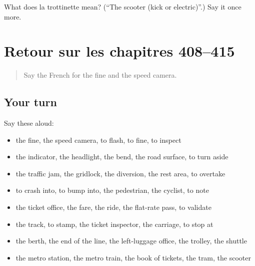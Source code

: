 \begin{tcolorbox}[breakable,colback=teal!4,colframe=teal!35!black,title={Before you move on}]
What does la trottinette mean? (\textquotedblleft{}The scooter (kick or electric)\textquotedblright{}.) Say it once more.
\end{tcolorbox}
\section[(dialogue)]{Retour sur les chapitres 408–415}

\label{lesson:FR-R415-revision-408-415}



\begin{quote}
Say the French for the fine and the speed camera.
\end{quote}

\subsection*{Your turn}
Say these aloud:

\begin{itemize}
\raggedright
  \item the fine, the speed camera, to flash, to fine, to inspect
  \item the indicator, the headlight, the bend, the road surface, to turn aside
  \item the traffic jam, the gridlock, the diversion, the rest area, to overtake
  \item to crash into, to bump into, the pedestrian, the cyclist, to note
  \item the ticket office, the fare, the ride, the flat-rate pass, to validate
  \item the track, to stamp, the ticket inspector, the carriage, to stop at
  \item the berth, the end of the line, the left-luggage office, the trolley, the shuttle
  \item the metro station, the metro train, the book of tickets, the tram, the scooter
\end{itemize}

